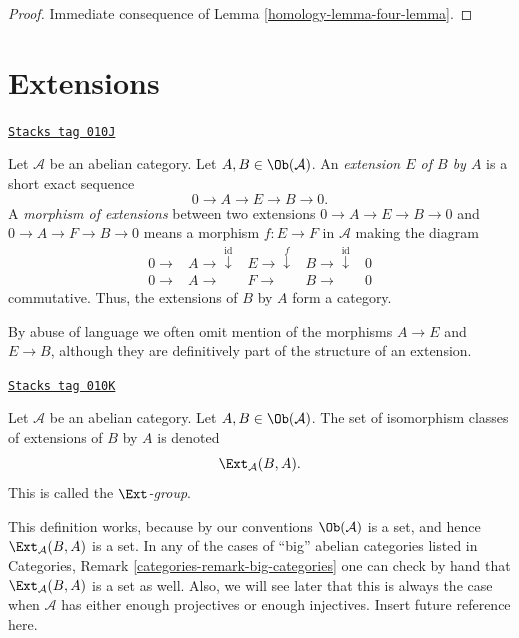 \begin{proof}

Immediate consequence of
Lemma \ref{homology-lemma-four-lemma}.
\end{proof}

\section{Extensions}
\label{homology-section-extensions}
\begin{definition}[Extension]
\label{homology-definition-extension}
\href{https://stacks.math.columbia.edu/tag/010J}{\texttt{Stacks tag 010J}}

Let $\mathcal{A}$ be an abelian category.
Let $A, B \in \Ob(\mathcal{A})$.
An {\it extension $E$ of $B$ by $A$} is a short
exact sequence
$$
0 \to A \to E \to B \to 0.
$$
A {\it morphism of extensions} between two
extensions $0 \to A \to E \to B \to 0$ and
$0 \to A \to F \to B \to 0$ means a morphism
$f : E \to F$ in $\mathcal{A}$ making the diagram
$$
\begin{array}{ccccc}0 \longrightarrow & A \longrightarrow\overset{\text{id}}{\downarrow} & E \longrightarrow\overset{f}{\downarrow} & B \longrightarrow\overset{\text{id}}{\downarrow} & 0 \\ 0 \longrightarrow & A \longrightarrow & F \longrightarrow & B \longrightarrow & 0\end{array}
$$
commutative.
Thus, the extensions of $B$ by $A$ form a category.
\end{definition}

By abuse of language we often omit mention of the
morphisms $A \to E$ and $E \to B$, although they are
definitively part of the structure of an extension.

\begin{definition}
\label{homology-definition-ext-group}
\href{https://stacks.math.columbia.edu/tag/010K}{\texttt{Stacks tag 010K}}

Let $\mathcal{A}$ be an abelian category.
Let $A, B \in \Ob(\mathcal{A})$.
The set of isomorphism classes of extensions
of $B$ by $A$ is denoted
$$
\Ext_\mathcal{A}(B, A).
$$
This is called the {\it $\Ext$-group}.
\end{definition}

This definition works, because by our conventions
$\Ob(\mathcal{A})$ is a set, and hence
$\Ext_\mathcal{A}(B, A)$ is a set.
In any of the cases of ``big'' abelian categories
listed in Categories, Remark \ref{categories-remark-big-categories}
one can check by hand that $\Ext_\mathcal{A}(B, A)$
is a set as well. Also, we will see later that this is
always the case when $\mathcal{A}$ has either enough projectives
or enough injectives. Insert future reference here.

